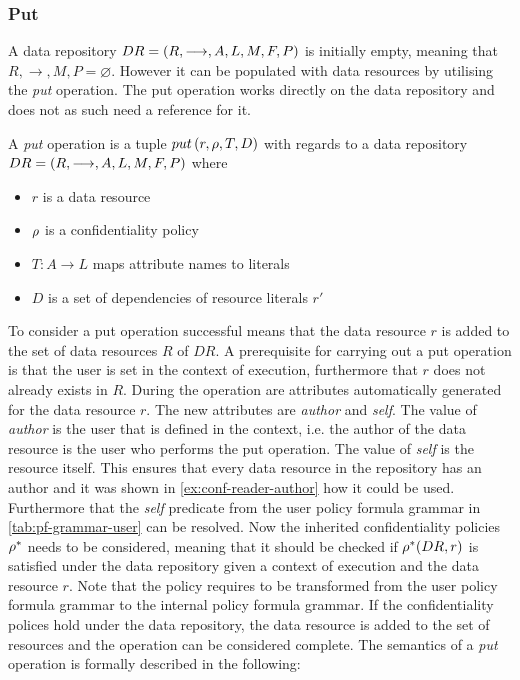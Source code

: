\subsubsection{Put}\label{sec:put}
A data repository $DR= \left( R, \longrightarrow, A, L, M, F, P \right)$ is initially empty, meaning that $R, \longrightarrow, M, P = \varnothing$. However it can be populated with data resources by utilising the \emph{put} operation. The put operation works directly on the data repository and does not as such need a reference for it.
\begin{definition}
A \emph{put} operation is a tuple $put \left( r, \rho, T, D \right)$ with regards to a data repository $DR= \left( R, \longrightarrow, A, L, M, F, P \right)$ where
\begin{itemize}
  \item $r$ is a data resource
  \item $\rho$ is a confidentiality policy
  \item $T : A \rightarrow L$ maps attribute names to literals
  \item $D$ is a set of dependencies of resource literals $r'$
\end{itemize}
\end{definition}
To consider a put operation successful means that the data resource $r$ is added to the set of data resources $R$ of $DR$. A prerequisite for carrying out a put operation is that the user is set in the context of execution, furthermore that $r$ does not already exists in $R$. During the operation are attributes automatically generated for the data resource $r$. The new attributes are \emph{author} and \emph{self}. The value of \emph{author} is the user that is defined in the context, i.e. the author of the data resource is the user who performs the put operation. The value of \emph{self} is the resource itself. This ensures that every data resource in the repository has an author and it was shown in \autoref{ex:conf-reader-author} how it could be used. Furthermore that the \emph{self} predicate from the user policy formula grammar in \autoref{tab:pf-grammar-user} can be resolved. Now the inherited confidentiality policies $\rho^{\ast}$ needs to be considered, meaning that it should be checked if $\rho^{\ast}(DR,r)$ is satisfied under the data repository given a context of execution and the data resource $r$. Note that the policy requires to be transformed from the user policy formula grammar to the internal policy formula grammar. If the confidentiality polices hold under the data repository, the data resource is added to the set of resources and the operation can be considered complete.
The semantics of a \emph{put} operation is formally described in the following:
